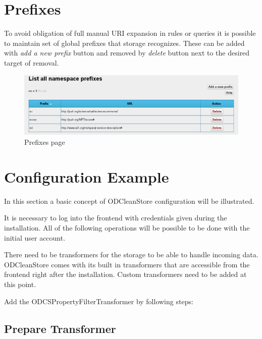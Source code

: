 {\section{Prefixes}
\label{sec:frontendPrefixMgmt}

To avoid obligation of full manual URI expansion in  rules or queries it is possible to maintain set of global  prefixes that storage recognizes. These can be added with \emph{add a new prefix} button and removed by \emph{delete} button next to the desired target of removal.

\begin{figure}[!ht]
    \centering
    \includegraphics[width=\textwidth]{images/fe-prefixes.png}
    \caption{Prefixes page}
	\label{fig:fePrefixes}
\end{figure}

\section{Configuration Example}

In this section a basic concept of ODCleanStore configuration will be illustrated.

It is necessary to log into the frontend with credentials given during the installation. All of the following operations will be possible to be done with the initial user account.

There need to be transformers for the storage to be able to handle incoming data. ODCleanStore comes with its built in transformers that are accessible from the frontend right after the installation. Custom transformers need to be added at this point.

Add the ODCSPropertyFilterTransformer by following steps:

\newpage
\subsection*{Prepare Transformer}
\label{sec:prepareTransformer}
\begin{enumerate}

\vspace*{0.2\textheight}


\end{enumerate}}
